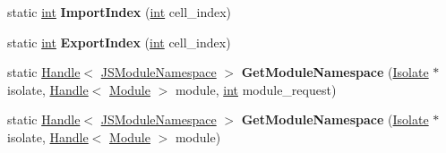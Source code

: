 \begin{DoxyCompactItemize}
\item 
\mbox{\label{classv8_1_1internal_1_1Module_a811341c01b0896a85e129734a1ff8520}} 
static \mbox{\hyperlink{classint}{int}} {\bfseries Import\+Index} (\mbox{\hyperlink{classint}{int}} cell\+\_\+index)
\item 
\mbox{\label{classv8_1_1internal_1_1Module_a181af20cf56b4ecea7254b2be738d4a1}} 
static \mbox{\hyperlink{classint}{int}} {\bfseries Export\+Index} (\mbox{\hyperlink{classint}{int}} cell\+\_\+index)
\item 
\mbox{\label{classv8_1_1internal_1_1Module_aa47b1b92c2b697ef3be0cbe1f904d3e4}} 
static \mbox{\hyperlink{classv8_1_1internal_1_1Handle}{Handle}}$<$ \mbox{\hyperlink{classv8_1_1internal_1_1JSModuleNamespace}{J\+S\+Module\+Namespace}} $>$ {\bfseries Get\+Module\+Namespace} (\mbox{\hyperlink{classv8_1_1internal_1_1Isolate}{Isolate}} $\ast$isolate, \mbox{\hyperlink{classv8_1_1internal_1_1Handle}{Handle}}$<$ \mbox{\hyperlink{classv8_1_1internal_1_1Module}{Module}} $>$ module, \mbox{\hyperlink{classint}{int}} module\+\_\+request)
\item 
\mbox{\label{classv8_1_1internal_1_1Module_a24e2086b4fd04059cdc7f118c125dd5a}} 
static \mbox{\hyperlink{classv8_1_1internal_1_1Handle}{Handle}}$<$ \mbox{\hyperlink{classv8_1_1internal_1_1JSModuleNamespace}{J\+S\+Module\+Namespace}} $>$ {\bfseries Get\+Module\+Namespace} (\mbox{\hyperlink{classv8_1_1internal_1_1Isolate}{Isolate}} $\ast$isolate, \mbox{\hyperlink{classv8_1_1internal_1_1Handle}{Handle}}$<$ \mbox{\hyperlink{classv8_1_1internal_1_1Module}{Module}} $>$ module)
\end{DoxyCompactItemize}
